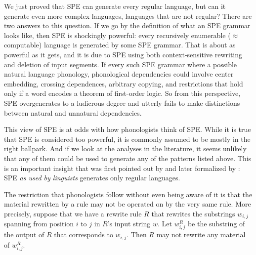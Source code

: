 We just proved that SPE can generate every regular language, but can it generate even more complex languages, languages that are not regular?
There are two answers to this question.
If we go by the definition of what an SPE grammar looks like, then SPE is shockingly powerful: every recursively enumerable ($\approx$ computable) language is generated by some SPE grammar.
That is about as powerful as it gets, and it is due to SPE using both context-sensitive rewriting and deletion of input segments.
If every such SPE grammar where a possible natural language phonology, phonological dependencies could involve center embedding, crossing dependences, arbitrary copying, and restrictions that hold only if a word encodes a theorem of first-order logic.
So from this perspective, SPE overgenerates to a ludicrous degree and utterly fails to make distinctions between natural and unnatural dependencies.

This view of SPE is at odds with how phonologists think of SPE\@.
While it is true that SPE is considered too powerful, it is commonly assumed to be mostly in the right ballpark.
And if we look at the analyses in the literature, it seems unlikely that any of them could be used to generate any of the patterns listed above.
This is an important insight that was first pointed out by \citet{Johnson72} and later formalized by \citet{KaplanKay94}: SPE \emph{as used by linguists} generates only regular languages.

The restriction that phonologists follow without even being aware of it is that the material rewritten by a rule may not be operated on by the very same rule.
More precisely, suppose that we have a rewrite rule $R$ that rewrites the substrings $w_{i,j}$ spanning from position $i$ to $j$ in $R$'s input string $w$.
Let $w^R_{i,j}$ be the substring of the output of $R$ that corresponds to $w_{i,j}$.
Then $R$ may not rewrite any material of $w^R_{i,j}$.

